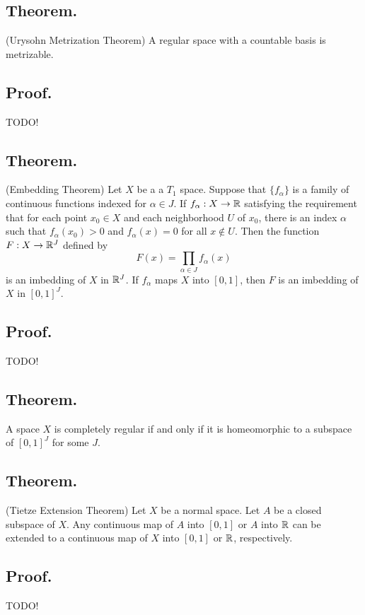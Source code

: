 \documentclass[titlepage]{article}
\begin{document}
\subsection{Theorem.} (Urysohn Metrization Theorem) A regular space with a countable basis is metrizable.

\subsection{Proof.} TODO!

\subsection{Theorem.} (Embedding Theorem) Let $X$ be a a $T_{1}$ space. Suppose that $\{f_{\alpha}\}$ is a family of continuous functions indexed for $\alpha \in J$. If $f_{\alpha}: X \to \mathbb{R}$ satisfying the requirement that for each point $x_{0} \in X$ and each neighborhood $U$ of $x_{0}$, there is an index $\alpha$ such that $f_{\alpha}(x_{0}) > 0$ and $f_{\alpha}(x) = 0$ for all $x \not\in U$. Then the function $F: X \to \mathbb{R}^{J}$ defined by 
$$F(x) = \prod_{\alpha \in J} f_{\alpha}(x)$$
is an imbedding of $X$ in $\mathbb{R}^{J}$. If $f_{\alpha}$ maps $X$ into $[0, 1]$, then $F$ is an imbedding of $X$ in $[0, 1]^{J}$.

\subsection{Proof.} TODO!

\subsection{Theorem.} A space $X$ is completely regular if and only if it is homeomorphic to a subspace of $[0, 1]^{J}$ for some $J$.

\subsection{Theorem.} (Tietze Extension Theorem) Let $X$ be a normal space. Let $A$ be a closed subspace of $X$. Any continuous map of $A$ into $[0, 1]$ or $A$ into $\mathbb{R}$ can be extended to a continuous map of $X$ into $[0, 1]$ or $\mathbb{R}$, respectively.

\subsection{Proof.} TODO!

\newpage {}
\end{document}
